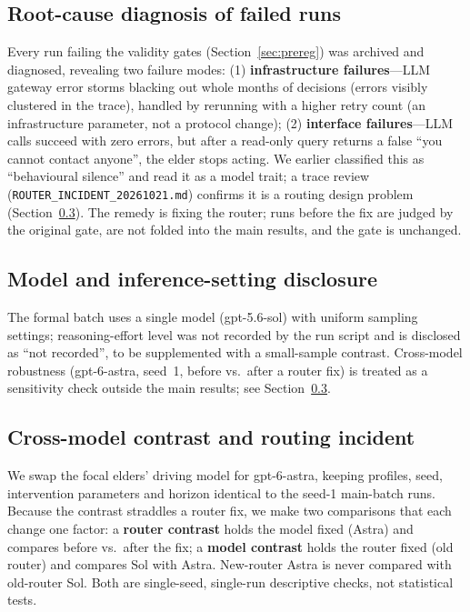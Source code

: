 \documentclass[10pt,twocolumn]{article}
\begin{document}
\subsection{Root-cause diagnosis of failed runs}\label{sec:failure}
Every run failing the validity gates (Section~\ref{sec:prereg}) was archived and diagnosed, revealing two failure modes: (1) \textbf{infrastructure failures}---LLM gateway error storms blacking out whole months of decisions (errors visibly clustered in the trace), handled by rerunning with a higher retry count (an infrastructure parameter, not a protocol change); (2) \textbf{interface failures}---LLM calls succeed with zero errors, but after a read-only query returns a false ``you cannot contact anyone'', the elder stops acting. We earlier classified this as ``behavioural silence'' and read it as a model trait; a trace review (\texttt{ROUTER\_INCIDENT\_20261021.md}) confirms it is a routing design problem (Section~\ref{sec:robust}). The remedy is fixing the router; runs before the fix are judged by the original gate, are not folded into the main results, and the gate is unchanged.

\subsection{Model and inference-setting disclosure}
The formal batch uses a single model (gpt-5.6-sol) with uniform sampling settings; reasoning-effort level was not recorded by the run script and is disclosed as ``not recorded'', to be supplemented with a small-sample contrast. Cross-model robustness (gpt-6-astra, seed~1, before vs.\ after a router fix) is treated as a sensitivity check outside the main results; see Section~\ref{sec:robust}.

\subsection{Cross-model contrast and routing incident}\label{sec:robust}
We swap the focal elders' driving model for gpt-6-astra, keeping profiles, seed, intervention parameters and horizon identical to the seed-1 main-batch runs. Because the contrast straddles a router fix, we make two comparisons that each change one factor: a \textbf{router contrast} holds the model fixed (Astra) and compares before vs.\ after the fix; a \textbf{model contrast} holds the router fixed (old router) and compares Sol with Astra. New-router Astra is never compared with old-router Sol. Both are single-seed, single-run descriptive checks, not statistical tests.
\end{document}
